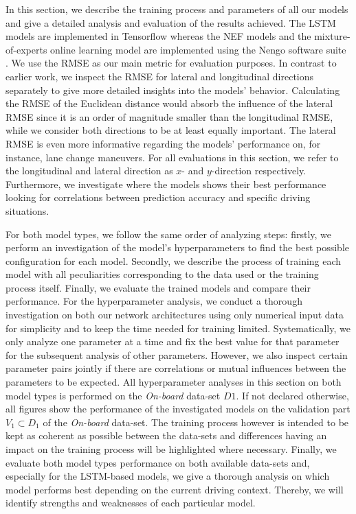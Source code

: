 In this section, we describe the training process and parameters of all our models and give a detailed analysis and evaluation of the results achieved.
The \ac{LSTM} models are implemented in Tensorflow \parencite{Abadi2016} whereas the \ac{NEF} models and the mixture-of-experts online learning model are implemented using the \acs{Nengo} software suite \parencite{Bekolay2014}.
We use the \ac{RMSE} as our main metric for evaluation purposes.
In contrast to earlier work, we inspect the \ac{RMSE} for lateral and longitudinal directions separately to give more detailed insights into the models' behavior.
Calculating the \ac{RMSE} of the Euclidean distance would absorb the influence of the lateral \ac{RMSE} since it is an order of magnitude smaller than the longitudinal \ac{RMSE}, while we consider both directions to be at least equally important.
The lateral \ac{RMSE} is even more informative regarding the models' performance on, for instance, lane change maneuvers.
For all evaluations in this section, we refer to the longitudinal and lateral direction as $x$- and $y$-direction respectively.
Furthermore, we investigate where the models shows their best performance looking for correlations between prediction accuracy and specific driving situations.

For both model types, we follow the same order of analyzing steps: firstly, we perform an investigation of the model's hyperparameters to find the best possible configuration for each model.
Secondly, we describe the process of training each model with all peculiarities corresponding to the data used or the training process itself.
Finally, we evaluate the trained models and compare their performance.
For the hyperparameter analysis, we conduct a thorough investigation on both our network architectures using only numerical input data for simplicity and to keep the time needed for training limited.
Systematically, we only analyze one parameter at a time and fix the best value for that parameter for the subsequent analysis of other parameters.
However, we also inspect certain parameter pairs jointly if there are correlations or mutual influences between the parameters to be expected.
All hyperparameter analyses in this section on both model types is performed on the \emph{On-board} data-set $D1$.
If not declared otherwise, all figures show the performance of the investigated models on the validation part $V_1 \subset D_1$ of the \emph{On-board} data-set.
The training process however is intended to be kept as coherent as possible between the data-sets and differences having an impact on the training process will be highlighted where necessary.
Finally, we evaluate both model types performance on both available data-sets and, especially for the \ac{LSTM}-based models, we give a thorough analysis on which model performs best depending on the current driving context.
Thereby, we will identify strengths and weaknesses of each particular model.

